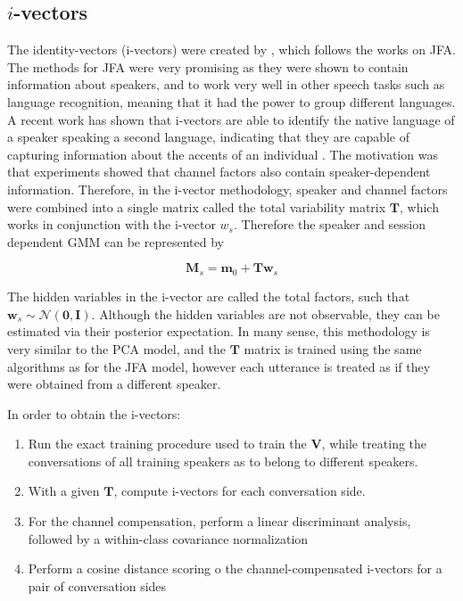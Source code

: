 \subsection{$i$-vectors}
The identity-vectors (i-vectors) were created by \cite{ivec}, which follows the works on JFA. The methods for JFA were very promising as they were shown to contain information about speakers, and to work very well in other speech tasks such as language recognition, meaning that it had the power to group different languages. A recent work has shown that i-vectors are able to identify the native language of a speaker speaking a second language, indicating that they are capable of capturing information about the accents of an individual \cite{ivec_nativelang}. The motivation was that experiments showed that channel factors also contain speaker-dependent information. Therefore, in the i-vector methodology, speaker and channel factors were combined into a single matrix called the total variability matrix $\bm{T}$, which works in conjunction with the i-vector $w_{s}$. Therefore the speaker and session dependent GMM can be represented by

$$\bm{M}_s = \bm{m}_0 + \bm{Tw}_s$$

The hidden variables in the i-vector are called the total factors, such that $\bm{w}_s \sim \mathcal{N}(\bm{0,I})$. Although the hidden variables are not observable, they can be estimated via their posterior expectation. In many sense, this methodology is very similar to the PCA model, and the $\bm{T}$ matrix is trained using the same algorithms as for the JFA model, however each utterance is treated as if they were obtained from a different speaker.

In order to obtain the i-vectors:
\begin{enumerate}
    \item Run the exact training procedure used to train the $\bm{V}$, while treating the conversations of all training speakers as to belong to different speakers.
    \item With a given $\bm{T}$, compute i-vectors for each conversation side.
    \item For the channel compensation, perform a linear discriminant analysis, followed by a within-class covariance normalization
    \item Perform a cosine distance scoring o the channel-compensated i-vectors for a pair of conversation sides
\end{enumerate}

